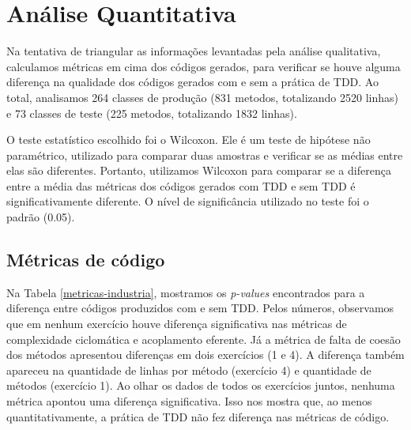 \documentclass[conference]{IEEEtran}
\begin{document}
\section{Análise Quantitativa}

Na tentativa de triangular as informações levantadas pela análise qualitativa,
calculamos métricas em cima dos códigos gerados, para verificar se houve
alguma diferença na qualidade dos códigos gerados com e sem a prática de TDD.
Ao total, analisamos
264 classes de produção (831 metodos, totalizando 2520 linhas) e
73 classes de teste (225 metodos, totalizando 1832 linhas).

O teste estatístico escolhido foi o Wilcoxon. Ele é um teste de hipótese não paramétrico,
utilizado para comparar duas amostras e verificar se as médias entre elas
são diferentes. Portanto, utilizamos Wilcoxon para comparar se a diferença entre a média
das métricas dos códigos gerados com TDD e sem TDD é significativamente diferente. O
nível de significância utilizado no teste foi o padrão (0.05).


\subsection{Métricas de código}

Na Tabela \ref{metricas-industria}, mostramos os \textit{p-values} encontrados para
a diferença entre códigos produzidos com e sem TDD. 
Pelos números, 
observamos que em nenhum exercício houve diferença significativa nas métricas
de complexidade ciclomática e acoplamento eferente. Já a métrica de falta
de coesão dos métodos apresentou diferenças em dois exercícios (1 e 4). 
A diferença também apareceu na quantidade de linhas por método (exercício 4)
e quantidade de métodos (exercício 1). Ao olhar os dados de todos os exercícios
juntos, nenhuma métrica apontou uma diferença significativa.
Isso nos mostra que, ao menos quantitativamente, a prática de TDD não fez
diferença nas métricas de código.
\end{document}
